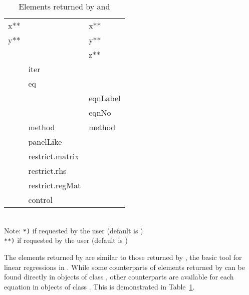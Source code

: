 \begin{table}[htbp]
{\begin{tabular}{lll}
x**             &                & x** \\
y**             &                & y** \\
                &                & z** \\
                & iter           & \\
                & eq             & \\
                &                & eqnLabel \\
                &                & eqnNo \\
                & method         & method \\
                & panelLike      & \\
                & restrict.matrix& \\
                & restrict.rhs   & \\
                & restrict.regMat& \\
                & control        & \\
\hline  \hline
\end{tabular}
}
\medskip\\
Note:
\texttt{*)} if requested by the user (default is )\\
\texttt{**)} if requested by the user (default is )
\caption{Elements returned by  and }
\label{tab:compare-lm}
\end{table}


The elements returned by 
are similar to those returned by ,
the basic tool for linear regressions in .
While some counterparts of elements returned by 
can be found directly in objects of class ,
other counterparts are available for each equation
in objects of class .
This is demonstrated in Table~\ref{tab:compare-lm}.
